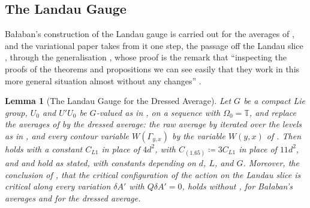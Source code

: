 \documentclass[11pt]{preprint}
\numberwithin{equation}{section}
\newtheorem{lemma}{Lemma}[section]
\theoremstyle{definition}
\theoremstyle{remark}
\theoremstyle{plain}
\begin{document}
\subsection{The Landau Gauge}

Ba{\l}aban's construction of the Landau gauge \cite{BalabanREG} is carried out for the averages of \cite{BalabanAVG}, and the variational paper takes from it one step, the passage off the Landau slice \cite[p.~296, l.~26--p.~297, l.~13; p.~302, l.~30]{BalabanVAR}, through the generalisation \cite[Theorem~8, p.~101]{BalabanREG}, whose proof is the remark that ``inspecting the proofs of the theorems and propositions we can see easily that they work in this more general situation almost without any changes'' \cite[p.~101, ll.~9--10]{BalabanREG}.

\begin{lemma}[The Landau Gauge for the Dressed Average]\label{lem:reg-dressed}
Let $G$ be a compact Lie group, $U_0$ and $U'U_0$ be $G$-valued as in \cite[(1.33)--(1.35)]{BalabanREG}, on a sequence with $\Omega_0 = \mathbb T$, and replace the averages of \cite{BalabanAVG} by the dressed average: the raw average by \cite[(0.4)]{BalabanRG1} iterated over the levels as in \cite[(43)]{BalabanAVG}, and every contour variable $W(\Gamma_{y,x})$ by the variable $W(y, x)$ of \cite[(0.11)]{BalabanRG1}. Then \cite[Lemma~1]{BalabanREG} holds with a constant $C_{L1}$ in place of $4d^2$, \cite[(1.65)]{BalabanREG} with $C_{(1.65)} \coloneqq 3C_{L1}$ in place of $11d^2$, and \cite[Propositions~3, 5--7, Theorems~2, 4]{BalabanREG} and \cite[Propositions~1, 2, 8--10, (213)--(214)]{BalabanAVG} hold as stated, with constants depending on $d$, $L$, and $G$. Moreover, the conclusion of \cite[p.~297, ll.~9--13; p.~302, l.~30]{BalabanVAR}, that the critical configuration of the action on the Landau slice is critical along every variation $\delta A'$ with $Q\delta A' = 0$, holds without \cite[Theorem~8]{BalabanREG}, for Ba{\l}aban's averages and for the dressed average.
\end{lemma}
\end{document}
